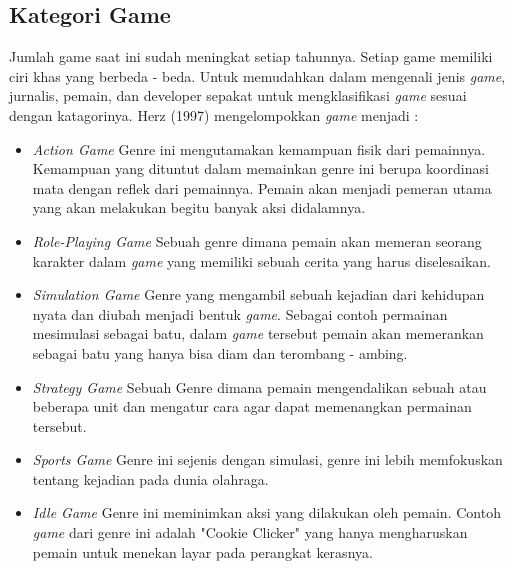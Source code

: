 	\subsection{Kategori Game}
	Jumlah game saat ini sudah meningkat setiap tahunnya. Setiap game memiliki ciri khas yang berbeda - beda. Untuk memudahkan dalam mengenali jenis \textit{game}, jurnalis, pemain, dan developer sepakat untuk mengklasifikasi \textit{game} sesuai dengan katagorinya. Herz (1997) mengelompokkan \textit{game} menjadi :
	\begin{itemize}
		\item \textit{Action Game}
			\subitem Genre ini mengutamakan kemampuan fisik dari pemainnya. Kemampuan yang dituntut dalam memainkan genre ini berupa koordinasi mata dengan reflek dari pemainnya. Pemain akan menjadi pemeran utama yang akan melakukan begitu banyak aksi didalamnya.
		\item \textit{Role-Playing Game}
			\subitem Sebuah genre dimana pemain akan memeran seorang karakter dalam \textit{game} yang memiliki sebuah cerita yang harus diselesaikan.
		\item \textit{Simulation Game}
			\subitem Genre yang mengambil sebuah kejadian dari kehidupan nyata dan diubah menjadi bentuk \textit{game}. Sebagai contoh permainan mesimulasi sebagai batu, dalam \textit{game} tersebut pemain akan memerankan sebagai batu yang hanya bisa diam dan terombang - ambing.
		\item \textit{Strategy Game}
			\subitem Sebuah Genre dimana pemain mengendalikan sebuah atau beberapa unit dan mengatur cara agar dapat memenangkan permainan tersebut.
		\item \textit{Sports Game}
			\subitem Genre ini sejenis dengan simulasi, genre ini lebih memfokuskan tentang kejadian pada dunia olahraga.
		\item \textit{Idle Game}
			\subitem Genre ini meminimkan aksi yang dilakukan oleh pemain. Contoh \textit{game} dari genre ini adalah "Cookie Clicker" yang hanya mengharuskan pemain untuk menekan layar pada perangkat kerasnya.
	\end{itemize}
	
